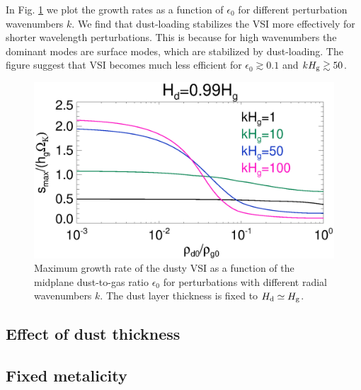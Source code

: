 In Fig. \ref{vsi_dust_loading_vareps} we plot the growth rates as a
function of $\epsilon_0$ for different perturbation wavenumbers $k$. We
find that dust-loading stabilizes the VSI more effectively for shorter
wavelength perturbations. This is because for high wavenumbers the
dominant modes are surface modes, which are stabilized by
dust-loading. The figure suggest that VSI becomes much less efficient
for $\epsilon_0\gtrsim 0.1$ and $kH_\mathrm{g}\gtrsim 50$. 

\begin{figure}
  \includegraphics[width=\linewidth]{figures/compare_eigenvals_vareps} 
  \caption{Maximum growth rate of the dusty VSI as a function of the
    midplane dust-to-gas ratio $\epsilon_0$ for perturbations with
    different radial wavenumbers $k$. The dust layer thickness is
    fixed to $H_\mathrm{d}\simeq H_\mathrm{g}$. 
    \label{vsi_dust_loading_vareps}
    }
\end{figure}

\subsection{Effect of dust thickness}



\subsection{Fixed metalicity} 